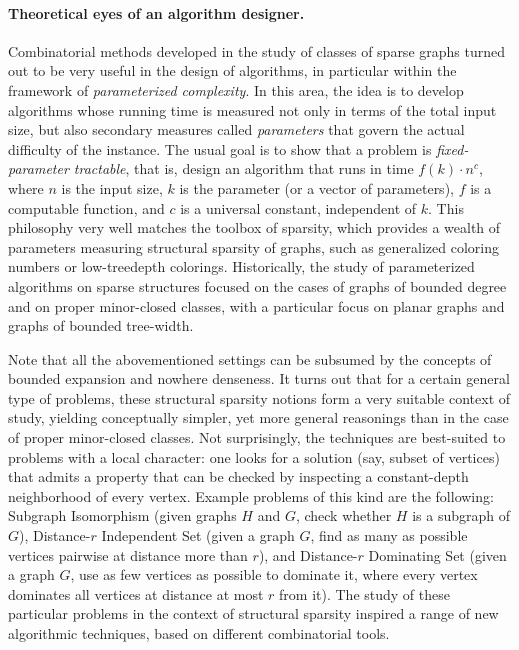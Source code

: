 \paragraph*{Theoretical eyes of an algorithm designer.} 
Combinatorial methods developed in the study of classes of sparse graphs turned out to be very useful in the design of algorithms, in particular within the framework of {\em{parameterized complexity}}.
In this area, the idea is to develop algorithms whose running time is measured not only in terms of the total input size, but also secondary measures called {\em{parameters}} that govern the actual 
difficulty of the instance. The usual goal is to show that a problem is {\em{fixed-parameter tractable}}, that is, 
design an algorithm that runs in time $f(k)\cdot n^c$, where $n$ is the input size, $k$ is the parameter (or a vector of parameters), 
$f$ is a computable function, and $c$ is a universal constant, independent of $k$.
This philosophy very well matches the toolbox of sparsity, which provides a wealth of parameters measuring structural sparsity of graphs, such as generalized coloring numbers or
low-treedepth colorings. Historically, the study of parameterized algorithms on sparse structures focused on the cases of graphs of bounded degree and on proper minor-closed classes, with a particular focus on
planar graphs and graphs of bounded tree-width.

Note that all the abovementioned settings can be subsumed by the concepts of bounded expansion and nowhere denseness.
It turns out that for a certain general type of problems, these structural sparsity notions form a very suitable context of study, yielding conceptually simpler, yet more general reasonings than 
in the case of proper minor-closed classes. Not surprisingly, the techniques are best-suited to problems with a local character:
one looks for a solution (say, subset of vertices) that admits a property that can be checked by inspecting a constant-depth neighborhood of every vertex.
Example problems of this kind are the following: Subgraph Isomorphism (given graphs $H$ and $G$, check whether $H$ is a subgraph of $G$), Distance-$r$ Independent Set (given a graph $G$, find as many as possible
vertices pairwise at distance more than $r$), and Distance-$r$ Dominating Set (given a graph $G$, use as few vertices as possible to dominate it, 
where every vertex dominates all vertices at distance at most $r$ from it).
The study of these particular problems in the context of structural sparsity inspired a range of new algorithmic techniques, based on different combinatorial tools.

